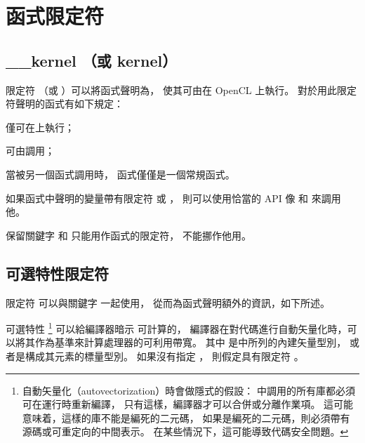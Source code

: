 \section[section:funcQlf]{函式限定符}

\subsection{__kernel （或 kernel）}

限定符  （或 ）可以將函式聲明為，
使其可由在 OpenCL 上執行。
對於用此限定符聲明的函式有如下規定：
\startigBase
\item 僅可在上執行；
\item 可由調用；
\item 當被另一個函式調用時，  函式僅僅是一個常規函式。
\stopigBase

\startnotepar
如果函式中聲明的變量帶有限定符  或 ，
則可以使用恰當的 API
 像  和  來調用他。

保留關鍵字  和  只能用作函式的限定符，
不能挪作他用。
\stopnotepar

\subsection[section:optAttrQlf]{可選特性限定符}

限定符  可以與關鍵字  一起使用，
從而為函式聲明額外的資訊，如下所述。

可選特性 \footnote{
自動矢量化（autovectorization）時會做隱式的假設：
  中調用的所有庫都必須可在運行時重新編譯，
只有這樣，編譯器才可以合併或分離作業項。
這可能意味着，這樣的庫不能是編死的二元碼，
如果是編死的二元碼，則必須帶有源碼或可重定向的中間表示。
在某些情況下，這可能導致代碼安全問題。}
 可以給編譯器暗示  可計算的{}，
編譯器在對代碼進行自動矢量化時，可以將其作為基準來計算處理器的可利用帶寬。
其中  是中所列的內建矢量型別，
或者是構成其元素的標量型別。
如果沒有指定 ，
則假定具有限定符 。

